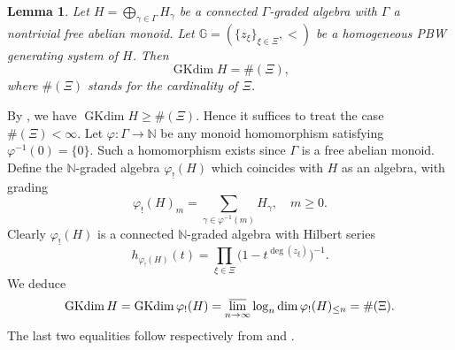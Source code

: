 \documentclass{article}
\makeatletter
\renewenvironment{proof}[1][\proofname]{\par
	\pushQED{\qed}%
	\normalfont \topsep6\p@\@plus6\p@\relax
	\trivlist
	\item[\hskip\labelsep
	\bfseries
	#1\@addpunct{.}]\ignorespaces
}{%
	\popQED\endtrivlist\@endpefalse
}
\theoremstyle{plain}
\newtheorem{lemma}[thm]{Lemma}
\theoremstyle{definition}
\numberwithin{equation}{section}
\DeclareMathOperator{\GKdim}{GKdim}
\newcommand{\GG}{\mathbb{G}}
\makeatother
\begin{document}
	
	\begin{lemma}\label{GKdimension}
		Let $H=\bigoplus_{\gamma\in \Gamma}H_{\gamma}$ be a connected $\Gamma$-graded algebra with $\Gamma$ a nontrivial free abelian monoid. Let $\GG=(\{z_{\xi}\}_{\xi\in \Xi},<)$ be a homogeneous PBW generating system of $H$. Then
		\[
		\GKdim H = \#(\Xi),
		\]
		where $\#(\Xi)$ stands for the cardinality of $\Xi$.
	\end{lemma}
	\begin{proof}
		By \cite[Lemma 1.4]{Zh24}, we have $\GKdim H\geq \#(\Xi)$. Hence it suffices to treat the case $\#(\Xi)<\infty$. Let $\varphi\colon \Gamma\to \mathbb{N}$ be any monoid homomorphism satisfying $\varphi^{-1}(0)=\{0\}$. Such a homomorphism exists since $\Gamma$ is a free abelian monoid. Define the $\mathbb{N}$-graded algebra $\varphi_{!}(H)$ which coincides with $H$ as an algebra, with grading
		\[
		\varphi_{!}(H)_{m} = \sum_{\gamma\in \varphi^{-1}(m)} H_{\gamma},\quad m\geq0.
		\]
		Clearly $\varphi_{!}(H)$ is a connected $\mathbb{N}$-graded algebra with Hilbert series
		\[
		h_{\varphi_{!}(H)}(t) = \prod_{\xi\in \Xi} \big (1-t^{\deg(z_{\xi})}\big)^{-1}.
		\]
		We deduce
		\[
		\GKdim H=\GKdim \varphi_{!}(H) = \varlimsup_{n\to \infty} \log_n \dim \varphi_{!}(H)_{\leq n} = \#(\Xi).
		\]
		The last two equalities follow respectively from \cite[Lemma 6.1 (b)]{KL00} and \cite[Proposition 2.21]{ATV91}.
	\end{proof}
	
\end{document}
